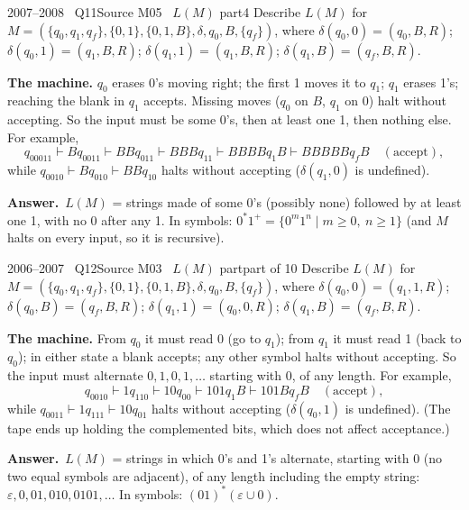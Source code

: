 \documentclass[11pt,a4paper]{article}
\newcommand{\eps}{\varepsilon}
\newcommand{\ans}[1]{\par\smallskip\noindent\colorbox{mist}{\parbox{\dimexpr\linewidth-2\fboxsep}{\sffamily\small\textbf{\color{teal}Answer.}\ \color{ink}#1}}\par}
\begin{document}
\begin{question}{2007--2008 \textbullet\ Q11}{Source M05 \textbullet\ $L(M)$ part}{4}
Describe $L(M)$ for $M=(\{q_0,q_1,q_f\},\{0,1\},\{0,1,B\},\delta,q_0,B,\{q_f\})$, where $\delta(q_0,0)=(q_0,B,R)$; $\delta(q_0,1)=(q_1,B,R)$; $\delta(q_1,1)=(q_1,B,R)$; $\delta(q_1,B)=(q_f,B,R)$.
\end{question}
\begin{solution}
\textbf{The machine.} $q_0$ erases 0's moving right; the first 1 moves it to $q_1$; $q_1$ erases 1's; reaching the blank in $q_1$ accepts. Missing moves ($q_0$ on $B$, $q_1$ on 0) halt without accepting. So the input must be some 0's, then at least one 1, then nothing else. For example,
\[q_00011\vdash Bq_0011\vdash BBq_011\vdash BBBq_11\vdash BBBBq_1B\vdash BBBBBq_fB\quad(\text{accept}),\]
while $q_0010\vdash Bq_010\vdash BBq_10$ halts without accepting ($\delta(q_1,0)$ is undefined).
\ans{$L(M)$ = strings made of some 0's (possibly none) followed by at least one 1, with no 0 after any 1. In symbols: $0^*1^+=\{0^m1^n\mid m\ge0,\ n\ge1\}$ (and $M$ halts on every input, so it is recursive).}
\end{solution}

\begin{question}{2006--2007 \textbullet\ Q12}{Source M03 \textbullet\ $L(M)$ part}{part of 10}
Describe $L(M)$ for $M=(\{q_0,q_1,q_f\},\{0,1\},\{0,1,B\},\delta,q_0,B,\{q_f\})$, where $\delta(q_0,0)=(q_1,1,R)$; $\delta(q_0,B)=(q_f,B,R)$; $\delta(q_1,1)=(q_0,0,R)$; $\delta(q_1,B)=(q_f,B,R)$.
\end{question}
\begin{solution}
\textbf{The machine.} From $q_0$ it must read 0 (go to $q_1$); from $q_1$ it must read 1 (back to $q_0$); in either state a blank accepts; any other symbol halts without accepting. So the input must alternate $0,1,0,1,\dots$ starting with 0, of any length. For example,
\[q_0010\vdash1q_110\vdash10q_00\vdash101q_1B\vdash101Bq_fB\quad(\text{accept}),\]
while $q_0011\vdash1q_111\vdash10q_01$ halts without accepting ($\delta(q_0,1)$ is undefined). (The tape ends up holding the complemented bits, which does not affect acceptance.)
\ans{$L(M)$ = strings in which 0's and 1's alternate, starting with 0 (no two equal symbols are adjacent), of any length including the empty string: $\eps,0,01,010,0101,\dots$ In symbols: $(01)^*(\eps\cup0)$.}
\end{solution}
\end{document}
